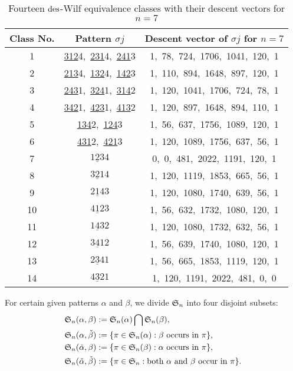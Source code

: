 \begin{table}[h!]
    \setlength{\tabcolsep}{15pt}%
    \renewcommand{\arraystretch}{1.2}%
    \begin{center}
      \begin{tabular}{c|c|c} 
        Class No. & Pattern $\sigma j$ & Descent vector of $\sigma j$ for $n=7$ \\
        \hline
        1 & \underline{312}4,\ \underline{231}4,\ \underline{241}3  & 1,\ 78,\ 724,\ 1706,\ 1041,\ 120,\ 1 \\
        2 & \underline{213}4,\ \underline{132}4,\ \underline{142}3  & 1,\ 110,\ 894,\ 1648,\ 897,\ 120,\ 1 \\
        3 & \underline{243}1,\ \underline{324}1,\ \underline{314}2  & 1,\ 120,\ 1041,\ 1706,\ 724,\ 78,\ 1 \\
        4 & \underline{342}1,\ \underline{423}1,\ \underline{413}2  & 1,\ 120,\ 897,\ 1648,\ 894,\ 110,\ 1 \\
        5 & \underline{134}2,\ \underline{124}3  & 1,\ 56,\ 637,\ 1756,\ 1089,\ 120,\ 1 \\
        6 & \underline{431}2,\ \underline{421}3  & 1,\ 120,\ 1089,\ 1756,\ 637,\ 56,\ 1 \\ 
        7 & $\underline{123}4$ & 0,\ 0,\ 481,\ 2022,\ 1191,\ 120,\ 1  \\ 
        8 & $\underline{321}4$ & 1,\ 120,\ 1119,\ 1853,\ 665,\ 56,\ 1   \\
        9 & $\underline{214}3$ & 1,\ 120,\ 1080,\ 1740,\ 639,\ 56,\ 1   \\ 
        10 & $\underline{412}3$ & 1,\ 56,\ 632,\ 1732,\ 1080,\ 120,\ 1   \\
        11 & $\underline{143}2$ & 1,\ 120,\ 1080,\ 1732,\ 632,\ 56,\ 1   \\ 
        12 & $\underline{341}2$ & 1,\ 56,\ 639,\ 1740,\ 1080,\ 120,\ 1   \\ 
        13 & $\underline{234}1$ & 1,\ 56,\ 665,\ 1853,\ 1119,\ 120,\ 1   \\
        14 & $\underline{432}1$ & 1,\ 120,\ 1191,\ 2022,\ 481,\ 0,\ 0   
      \end{tabular}
    \end{center}
  \caption{Fourteen $\des$-Wilf equivalence classes with their descent vectors for $n=7$}
  \label{tab: descent vector of length 4}
\end{table}

For certain given patterns $\alpha$ and $\beta$, we divide $\S_n$ into four disjoint subsets:
\begin{align*}
  \S_n(\alpha,\beta)&:=\S_n(\alpha) \bigcap \S_n(\beta), \\
  \S_n(\alpha,\check{\beta})&:=\{\pi \in \S_n(\alpha): \beta\text{ occurs in }\pi\} ,\\
  \S_n(\check{\alpha},\beta)&:=\{\pi \in \S_n(\beta): \alpha\text{ occurs in }\pi\} ,\\
  \S_n(\check{\alpha},\check{\beta})&:=\{\pi \in \S_n:\text{both }\alpha\text{ and }\beta\text{ occur in }\pi\} . 
\end{align*}

